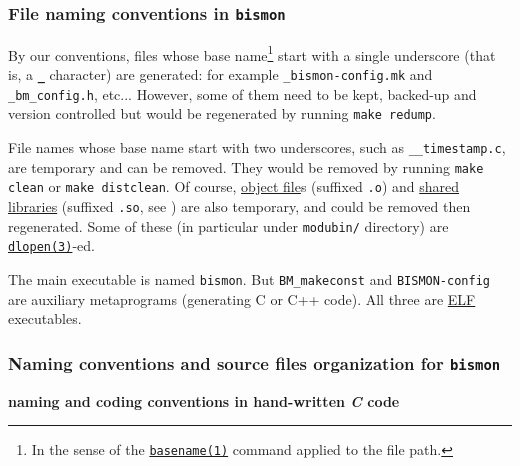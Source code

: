 \subsubsection{File naming conventions in \texttt{bismon}}

By our conventions, files  
whose base name\footnote{In the sense of the
\href{https://man7.org/linux/man-pages/man1/basename.1.html}{\texttt{basename(1)}}
command applied to the file path.} start with a single underscore
(that is, a \textbf{\texttt{\_}} character) are generated: for example
\texttt{\_bismon-config.mk} and \texttt{\_bm\_config.h},
etc... However, some of them need to be kept, backed-up and version
controlled but would be regenerated by running
 
 \texttt{make redump}.

File names whose base name start with two underscores, such as
\texttt{\_\_timestamp.c}, are temporary and can be removed. They would
be removed by running \texttt{make clean} or \texttt{make
  distclean}.
 Of course,
\href{https://en.wikipedia.org/wiki/Object_file}{object file}s
(suffixed \texttt{.o}) and
\href{https://en.wikipedia.org/wiki/Library_(computing)#Shared_libraries}{shared
  libraries} (suffixed \texttt{.so}, see
\cite{Drepper:2011:sharedlib}) are also temporary, and could be
removed then regenerated. Some of these (in particular under
\texttt{modubin/} directory) are
\href{https://man7.org/linux/man-pages/man3/dlopen.3.html}{\texttt{dlopen(3)}}-ed.

The main executable is named \texttt{bismon}. But
\texttt{BM\_makeconst} and \texttt{BISMON-config} are auxiliary
metaprograms (generating C or C++ code). All three are
\href{https://en.wikipedia.org/wiki/Executable_and_Linkable_Format}{ELF}
executables.

\medskip

\subsubsection{Naming conventions and source files organization for \texttt{bismon}}

\medskip

{\large \textbf{naming and coding conventions in hand-written \emph{C} code}}


